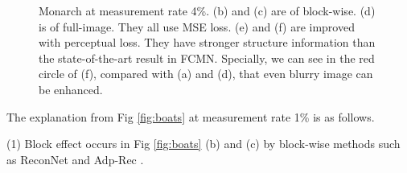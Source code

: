 \documentclass[runningheads]{llncs}
\begin{document}
\begin{figure}[!h]
  \centering
  \caption{Monarch at measurement rate 4\%. (b) and (c) are of block-wise. (d) is of full-image. They all use MSE loss. (e) and (f) are improved with perceptual loss. They have stronger structure information than the state-of-the-art result in FCMN. Specially, we can see in the \textcolor[rgb]{1.00,0.00,0.00}{red circle} of (f), compared with (a) and (d), that even blurry image can be enhanced.}
  \label{fig:Monarch}
\end{figure}

The explanation from Fig \ref{fig:boats} at measurement rate 1\% is as follows.

(1)	Block effect occurs in Fig \ref{fig:boats} (b) and (c) by block-wise methods such as ReconNet \cite{Kulkarni2016ReconNet} and Adp-Rec \cite{Xie2017Adaptive}.
\end{document}
